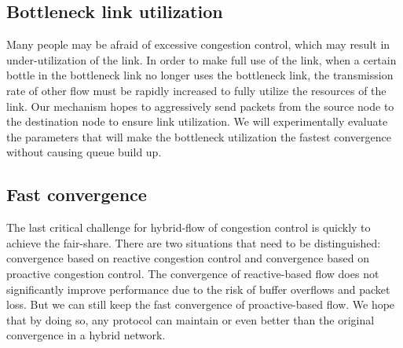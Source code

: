 \documentclass[conference]{IEEEtran}
\begin{document}
\subsection{Bottleneck link utilization}
Many people may be afraid of excessive congestion control, which may result in under-utilization of the link. In order to make full use of the link, when a certain bottle in the bottleneck link no longer uses the bottleneck link, the transmission rate of other flow must be rapidly increased to fully utilize the resources of the link. Our mechanism hopes to aggressively send packets from the source node to the destination node to ensure link utilization. We will experimentally evaluate the parameters that will make the bottleneck utilization the fastest convergence without causing queue build up.

\subsection{Fast convergence}

The last critical challenge for hybrid-flow of congestion control is quickly to achieve the fair-share. There are two situations that need to be distinguished: convergence based on reactive congestion control and convergence based on proactive congestion control. The convergence of reactive-based flow does not significantly improve performance due to the risk of buffer overflows and packet loss. But we can still keep the fast convergence of proactive-based flow. We hope that by doing so, any protocol can maintain or even better than the original convergence in a hybrid network.



\end{document}
